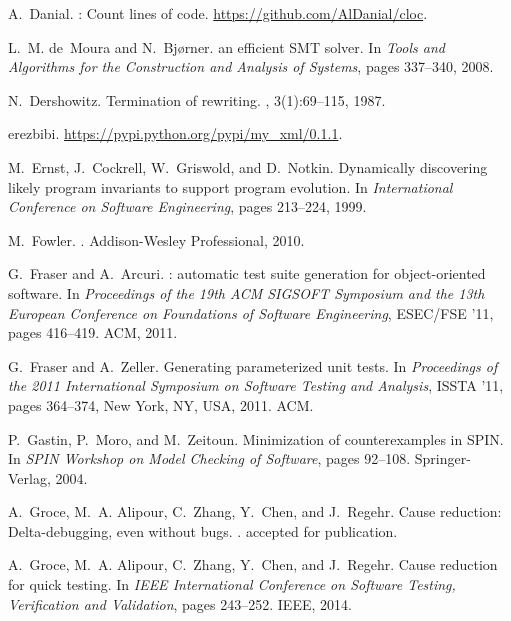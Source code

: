 \documentclass[format=sigconf]{acmart}
\begin{document}
\begin{thebibliography}{10}
A.~Danial.
: Count lines of code.
\newblock \url{https://github.com/AlDanial/cloc}.

L.~M. de~Moura and N.~Bj{\o}rner.
 an efficient {SMT} solver.
\newblock In {\em Tools and Algorithms for the Construction and Analysis of
  Systems}, pages 337--340, 2008.

N.~Dershowitz.
\newblock Termination of rewriting.
, 3(1):69--115, 1987.

erezbibi.
\newblock \url{https://pypi.python.org/pypi/my_xml/0.1.1}.

M.~Ernst, J.~Cockrell, W.~Griswold, and D.~Notkin.
\newblock Dynamically discovering likely program invariants to support program
  evolution.
\newblock In {\em International Conference on Software Engineering}, pages
  213--224, 1999.

M.~Fowler.
.
\newblock Addison-Wesley Professional, 2010.

G.~Fraser and A.~Arcuri.
: automatic test suite generation for object-oriented
  software.
\newblock In {\em Proceedings of the 19th ACM SIGSOFT Symposium and the 13th
  European Conference on Foundations of Software Engineering}, ESEC/FSE '11,
  pages 416--419. ACM, 2011.

G.~Fraser and A.~Zeller.
\newblock Generating parameterized unit tests.
\newblock In {\em Proceedings of the 2011 International Symposium on Software
  Testing and Analysis}, ISSTA '11, pages 364--374, New York, NY, USA, 2011.
  ACM.

P.~Gastin, P.~Moro, and M.~Zeitoun.
\newblock Minimization of counterexamples in {SPIN}.
\newblock In {\em SPIN Workshop on Model Checking of Software}, pages 92--108.
  Springer-Verlag, 2004.

A.~Groce, M.~A. Alipour, C.~Zhang, Y.~Chen, and J.~Regehr.
\newblock Cause reduction: Delta-debugging, even without bugs.
.
\newblock accepted for publication.

A.~Groce, M.~A. Alipour, C.~Zhang, Y.~Chen, and J.~Regehr.
\newblock Cause reduction for quick testing.
\newblock In {\em IEEE International Conference on Software Testing,
  Verification and Validation}, pages 243--252. IEEE, 2014.


\end{thebibliography}
\end{document}
